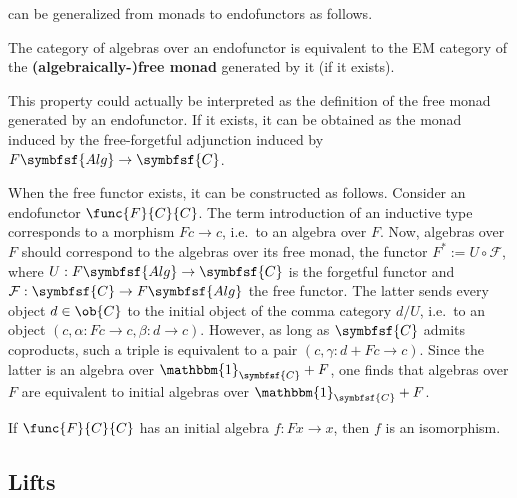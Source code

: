      can be generalized from monads to endofunctors as follows.
    \begin{property}\label{cat:algebraically_free_monad}
        The category of algebras over an endofunctor is equivalent to the EM category of the \textbf{(algebraically-)free monad} generated by it (if it exists).
    \end{property}
    \begin{construct}
        This property could actually be interpreted as the definition of the free monad generated by an endofunctor. If it exists, it can be obtained as the monad induced by the free-forgetful adjunction induced by $F\symbfsf{Alg}\rightarrow\symbfsf{C}$.

        When the free functor exists, it can be constructed as follows. Consider an endofunctor $\func{F}{C}{C}$. The term introduction of an inductive type corresponds to a morphism $Fc\rightarrow c$, i.e.~to an algebra over $F$. Now, algebras over $F$ should correspond to the algebras over its free monad, the functor $F^*:=U\circ\mathcal{F}$, where $U:F\symbfsf{Alg}\rightarrow\symbfsf{C}$ is the forgetful functor and $\mathcal{F}:\symbfsf{C}\rightarrow F\symbfsf{Alg}$ the free functor. The latter sends every object $d\in\ob{C}$ to the initial object of the comma category $d/U$, i.e.~to an object $(c,\alpha: Fc\rightarrow c,\beta:d\rightarrow c)$. However, as long as $\symbfsf{C}$ admits coproducts, such a triple is equivalent to a pair $(c,\gamma:d+Fc\rightarrow c)$. Since the latter is an algebra over $\mathbbm{1}_{\symbfsf{C}}+F$, one finds that algebras over $F$ are equivalent to initial algebras over $\mathbbm{1}_{\symbfsf{C}}+F$.
    \end{construct}

    \begin{theorem}[Lambek]
        If $\func{F}{C}{C}$ has an initial algebra $f:Fx\rightarrow x$, then $f$ is an isomorphism.
    \end{theorem}

\subsection{Lifts}

